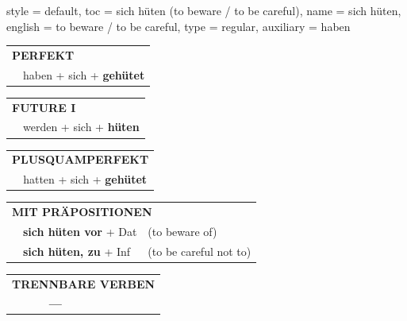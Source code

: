 \begin{verbentry}{
  style = {default},
  toc = {sich hüten (to beware / to be careful)},
  name = {sich hüten},
  english = {to beware / to be careful},
  type = {regular},
  auxiliary = {haben}
}
 \begin{tabular}{rl}
     \multicolumn{2}{l}{\textbf{PERFEKT}}\\
   & haben + sich + \textbf{gehütet}\\
  \end{tabular}
\hfill
   \begin{tabular}{rl}
    \multicolumn{2}{l}{\textbf{FUTURE I} }\\
   & werden + sich + \textbf{hüten}\\
  \end{tabular}
\hfill
   \begin{tabular}{rl}
      \multicolumn{2}{l}{\textbf{PLUSQUAMPERFEKT}}\\
   & hatten + sich + \textbf{gehütet}\\
  \end{tabular}

   \vspace{10pt}

   \begin{tabular}{lll}
      \multicolumn{3}{l}{\textbf{MIT PRÄPOSITIONEN}}\\
& \textbf{sich hüten vor} + Dat & (to beware of)\\
& \textbf{sich hüten, zu} + Inf & (to be careful not to)\\
\end{tabular}
  \hfill
   \begin{tabular}{lll}
\multicolumn{3}{l}{\textbf{TRENNBARE VERBEN}}\\
& \textbf{---} & \\
\end{tabular}

  \vspace{-5pt}
\end{verbentry}

